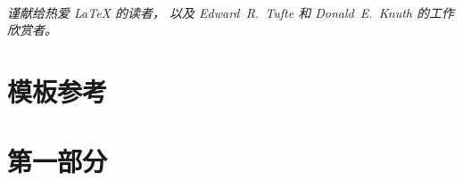 \documentclass[nofonts,nohyper,nobib]{tufte-book}
\begin{document}
\listoftables

\cleardoublepage
~\vfill
\begin{doublespace}
\noindent\fontsize{18}{22}\selectfont\itshape
\nohyphenation
谨献给热爱 \LaTeX{} 的读者，
以及 \mbox{Edward R.~Tufte} 
和 \mbox{Donald E.~Knuth} 的工作欣赏者。
\end{doublespace}
\vfill
\vfill


\mainmatter

\part{模板参考}


\part{第一部分}












\backmatter



\printindex


\end{document}
